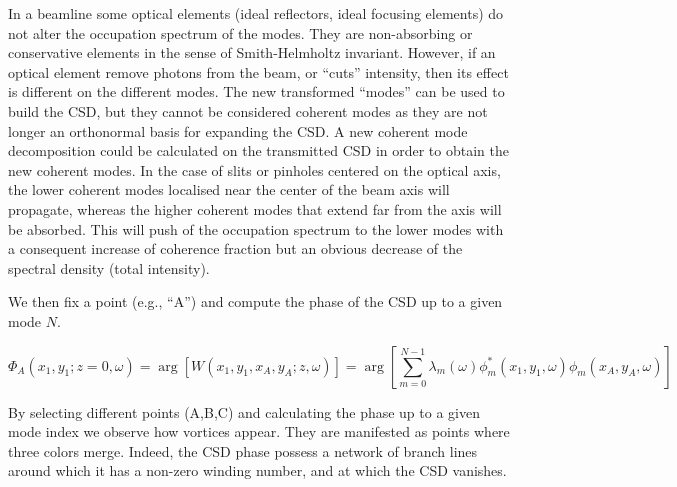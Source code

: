 \documentclass[a4paper,10pt]{article}
\begin{document}
In a beamline some optical elements (ideal reflectors, ideal focusing elements) do not alter the occupation spectrum of the modes. They are non-absorbing or conservative elements in the sense of Smith-Helmholtz invariant. However, if an optical element remove photons from the beam, or ``cuts'' intensity, then its effect is different on the different modes. The new transformed ``modes'' can be used to build the CSD, but they cannot be considered coherent modes as they are not longer an orthonormal basis for expanding the CSD. A new coherent mode decomposition could be calculated on the transmitted CSD in order to obtain the new coherent modes. In the case of slits or pinholes centered on the optical axis, the lower coherent modes localised near the center of the beam axis will propagate, whereas the higher coherent modes that extend far from the axis will be absorbed. This will push of the occupation spectrum to the lower modes with a consequent increase of coherence fraction but an obvious decrease of the spectral density (total intensity).     





We then fix a point (e.g., ``A'') and compute the phase of the CSD up to a given mode $N$. 

\begin{equation}\label{phase_of_W}
\Phi_A(x_1,y_1;z=0,\omega)=\arg[W(x_1,y_1,x_A,y_A;z,\omega)]=\arg[
\sum_{m=0}^{N-1} \lambda_m(\omega)
\phi_m^*(x_1,y_1,\omega)
\phi_m(x_A,y_A, \omega)]
\end{equation}

By selecting different points (A,B,C) and calculating the phase up to a given mode index we observe how vortices appear. They are manifested as points where three colors merge.  Indeed, the CSD phase possess a network of branch lines around which it has a non-zero winding number, and at which the CSD vanishes.
\end{document}
